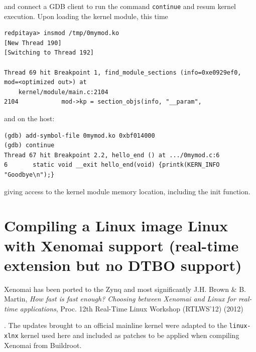 \documentclass{article}
\begin{document}
{{{\noindent and connect a GDB client to run the command {\tt continue} and resum kernel execution. Upon loading
the kernel module, this time

\begin{verbatim}
redpitaya> insmod /tmp/0mymod.ko 
[New Thread 190]
[Switching to Thread 192]
 
Thread 69 hit Breakpoint 1, find_module_sections (info=0xe0929ef0, mod=<optimized out>) at
	kernel/module/main.c:2104
2104            mod->kp = section_objs(info, "__param",
\end{verbatim}

\noindent and on the host:

\begin{verbatim}
(gdb) add-symbol-file 0mymod.ko 0xbf014000
(gdb) continue
Thread 67 hit Breakpoint 2.2, hello_end () at .../0mymod.c:6
6       static void __exit hello_end(void) {printk(KERN_INFO "Goodbye\n");}
\end{verbatim}

\noindent giving access to the kernel module memory location, including the init function.





\section{Compiling a Linux image Linux with Xenomai support (real-time extension but no DTBO 
support)}\label{xe}

Xenomai has been ported to the Zynq
and most significantly J.H. Brown \& B. Martin, {\em How fast is fast enough? Choosing between 
Xenomai and Linux for real-time applications}, Proc. 12th Real-Time Linux 
Workshop (RTLWS’12) (2012)}. The updates brought to an official mainline kernel were adapted
to the {\tt linux-xlnx} kernel used here and included as patches to be applied when compiling
Xenomai from Buildroot.

%

}}
\end{document}
